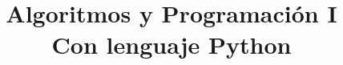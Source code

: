 \documentclass[oldfontcommands, 11pt]{memoir}
\theoremstyle{definition}
\theoremstyle{remark}
\begin{document}
%
\title{Algoritmos y Programación I \\ Con lenguaje Python}
\maketitle

\tableofcontents  %
























\appendix

%
%
%
%





%
%
\end{document}
